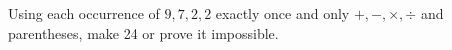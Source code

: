 Using each occurrence of $9,7,2,2$ exactly once and only $+,-,\times,\div$ and parentheses, make 24 or prove it impossible.
